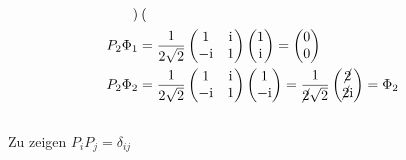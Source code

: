 \begin{align*}
\begin{pmatrix}
    \end{pmatrix} \\
    P_2\Phi_1 &= \frac 1{2\sqrt 2}
    \begin{pmatrix}
        1 & \mathrm i \\
        -\mathrm i & 1
    \end{pmatrix} \begin{pmatrix}
        1 \\ \mathrm i 
    \end{pmatrix}
    = \begin{pmatrix}
        0 \\ 0
    \end{pmatrix} \\
    P_2\Phi_2 &= \frac 1{2\sqrt 2}
    \begin{pmatrix}
        1 & \mathrm i \\
        -\mathrm i & 1
    \end{pmatrix} \begin{pmatrix}
        1 \\ -\mathrm i 
    \end{pmatrix}
    = \frac 1{\cancel{2}\sqrt 2}\begin{pmatrix}
        \cancel{2} \\ \cancel{2} \mathrm i
    \end{pmatrix} 
    =\Phi_2\\ 
\end{align*}

\subsection{}
Zu zeigen $P_iP_j = \delta_{ij}$

